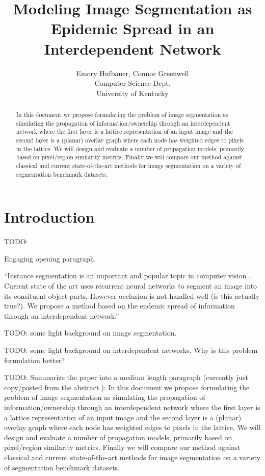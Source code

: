 \documentclass[twocolumn]{article}
\title{Modeling Image Segmentation as Epidemic Spread in an Interdependent Network}
\author{
  Emory Hufbauer, Connor Greenwell \\
  Computer Science Dept. \\
  University of Kentucky
}
\date{}
\newcommand{\todo}[1]{}
\renewcommand{\todo}[1]{{\color{red} TODO: {#1}}}
\begin{document}
\maketitle

\begin{abstract}
In this document we propose formulating the problem of image segmentation as simulating the propagation of
information/ownership through an interdependent network where the first layer is a lattice representation of an input image
and the second layer is a (planar) overlay graph where each node has weighted edges to pixels in the lattice. We will design
and evaluate a number of propagation models, primarily based on pixel/region similarity metrics. Finally we will compare our
method against classical and current state-of-the-art methods for image segmentation on a variety of segmentation benchmark
datasets. 
\end{abstract}

\section{Introduction}

\todo{
Engaging opening paragraph. 

``Instance segmentation is an important and popular topic in computer vision \cite{newell2017associative, li2017fully,
ren2017end}. Current state of the art uses recurrent neural networks to segment an image into its consituent object parts.
However occlusion is not handled well (is this actually true?). We propose a method based on the endemic spread of information
through an interdependent network.'' 
}

\todo{some light background on image segmentation.}

\todo{some light background on interdependent networks. Why is this problem formulation better?}

\todo{
Summarize the paper into a medium length paragraph (currently just copy/pasted from the abstract.): In this document we propose formulating the problem of image segmentation as simulating the propagation of
information/ownership through an interdependent network where the first layer is a lattice representation of an input image
and the second layer is a (planar) overlay graph where each node has weighted edges to pixels in the lattice. We will design
and evaluate a number of propagation models, primarily based on pixel/region similarity metrics. Finally we will compare our
method against classical and current state-of-the-art methods for image segmentation on a variety of segmentation benchmark
datasets. 
}
\end{document}

